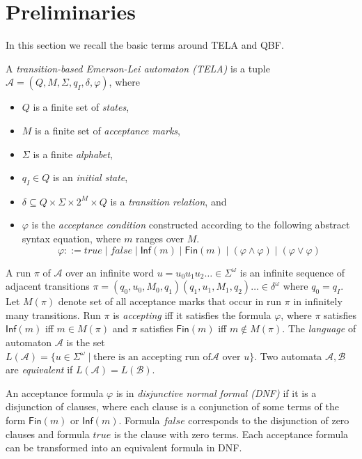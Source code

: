 \documentclass[a4paper,UKenglish,cleveref, autoref, anonymous, thm-restate]{lipics-v2021}
\def\Inf{\ensuremath{\mathsf{Inf}}}
\def\Fin{\ensuremath{\mathsf{Fin}}}
\def\false{\mathit{false}}
\def\true{\mathit{true}}
\newcommand{\mA}{\mathcal{A}}
\newcommand{\mB}{\mathcal{B}}
\begin{document}

\section{Preliminaries}\label{sec:prelim}

In this section we recall the basic terms around TELA and QBF.

\begin{definition}[TELA]
  A \emph{transition-based Emerson-Lei automaton (TELA)} is a tuple
  $\mA =(Q,M,\Sigma,q_I,\delta,\varphi)$, where
  \begin{itemize}
  \item $Q$ is a finite set of \emph{states},
  \item $M$ is a finite set of \emph{acceptance marks},
  \item $\Sigma$ is a finite \emph{alphabet},
  \item $q_I\in Q$ is an \emph{initial state},
  \item $\delta \subseteq Q \times \Sigma \times 2^{M} \times Q$ is a
    \emph{transition relation}, and
  \item $\varphi$ is the \emph{acceptance condition} constructed
    according to the following abstract syntax equation, where $m$
    ranges over $M$.
    $$\varphi ::= \true \mid \false \mid \Inf(m) \mid \Fin(m) \mid \left( \varphi \land \varphi \right) \mid \left( \varphi \lor \varphi \right)$$
\end{itemize}
\end{definition}

A run $\pi$ of $\mA$ over an infinite word
$u = u_{0}u_{1}u_{2}\dots \in \Sigma^{\omega}$ is an infinite sequence
of adjacent transitions
$\pi=(q_0,u_0,M_0,q_1)(q_1,u_1,M_1,q_2)\dots\in\delta^{\omega}$ where
$q_0=q_I$. Let $M(\pi)$ denote set of all acceptance marks that occur
in run $\pi$ in infinitely many transitions. Run $\pi$ is
\emph{accepting} iff it satisfies the formula $\varphi$, where $\pi$
satisfies $\Inf(m)$ iff $m\in M(\pi)$ and $\pi$ satisfies $\Fin(m)$
iff $m\not\in M(\pi)$. The \emph{language} of automaton $\mA$ is the
set
$L(\mA)=\{u\in \Sigma^{\omega}\mid\textrm{there is an accepting run of
}\mA\textrm{ over }u\}$. Two automata $\mA,\mB$ are \emph{equivalent}
if $L(\mA)=L(\mB)$.

An acceptance formula $\varphi$ is in \emph{disjunctive normal formal
  (DNF)} if it is a disjunction of clauses, where each clause is a
conjunction of some terms of the form $\Fin(m)$ or $\Inf(m)$.  Formula
$\false$ corresponds to the disjunction of zero clauses and formula
$\true$ is the clause with zero terms. Each acceptance formula can be
transformed into an equivalent formula in DNF.
\end{document}
